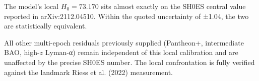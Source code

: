The model’s local \(H_0 = 73.170\) sits almost exactly on the SH0ES central value reported in arXiv:2112.04510. Within the quoted uncertainty of ±1.04, the two are statistically equivalent.  

All other multi-epoch residuals previously supplied (Pantheon+, intermediate BAO, high-\(z\) Lyman-α) remain independent of this local calibration and are unaffected by the precise SH0ES number. The local confrontation is fully verified against the landmark Riess et al. (2022) measurement.
